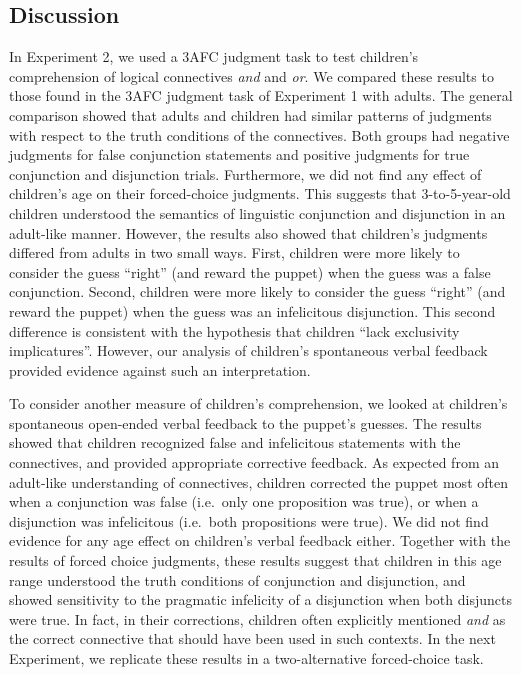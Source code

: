\documentclass[,man,floatsintext]{apa6}
\begin{document}
\hypertarget{discussion-1}{%
\subsection{Discussion}\label{discussion-1}}

In Experiment 2, we used a 3AFC judgment task to test children's comprehension of logical connectives \emph{and} and \emph{or}. We compared these results to those found in the 3AFC judgment task of Experiment 1 with adults. The general comparison showed that adults and children had similar patterns of judgments with respect to the truth conditions of the connectives. Both groups had negative judgments for false conjunction statements and positive judgments for true conjunction and disjunction trials. Furthermore, we did not find any effect of children's age on their forced-choice judgments. This suggests that 3-to-5-year-old children understood the semantics of linguistic conjunction and disjunction in an adult-like manner. However, the results also showed that children's judgments differed from adults in two small ways. First, children were more likely to consider the guess \enquote{right} (and reward the puppet) when the guess was a false conjunction. Second, children were more likely to consider the guess \enquote{right} (and reward the puppet) when the guess was an infelicitous disjunction. This second difference is consistent with the hypothesis that children \enquote{lack exclusivity implicatures}. However, our analysis of children's spontaneous verbal feedback provided evidence against such an interpretation.

To consider another measure of children's comprehension, we looked at children's spontaneous open-ended verbal feedback to the puppet's guesses. The results showed that children recognized false and infelicitous statements with the connectives, and provided appropriate corrective feedback. As expected from an adult-like understanding of connectives, children corrected the puppet most often when a conjunction was false (i.e.~only one proposition was true), or when a disjunction was infelicitous (i.e.~both propositions were true). We did not find evidence for any age effect on children's verbal feedback either. Together with the results of forced choice judgments, these results suggest that children in this age range understood the truth conditions of conjunction and disjunction, and showed sensitivity to the pragmatic infelicity of a disjunction when both disjuncts were true. In fact, in their corrections, children often explicitly mentioned \emph{and} as the correct connective that should have been used in such contexts. In the next Experiment, we replicate these results in a two-alternative forced-choice task.
\end{document}
